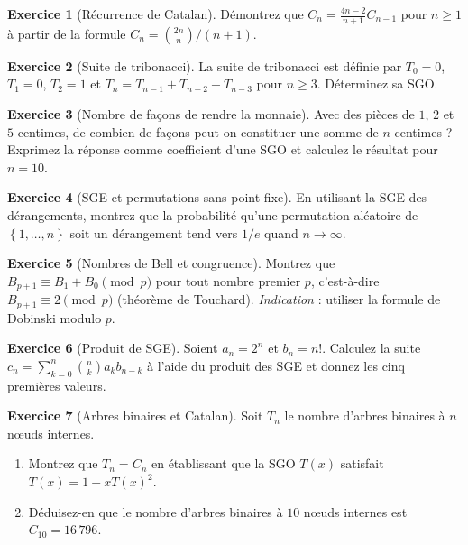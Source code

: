 \documentclass[12pt,a4paper,openany]{book}
\theoremstyle{definition}
\newtheorem{exercice}{Exercice}[chapter]
\theoremstyle{plain}
\theoremstyle{remark}
\newcommand{\set}[1]{\left\{#1\right\}}
\begin{document}
\begin{exercice}[Récurrence de Catalan]
\label{exo:catalan-rec}
Démontrez que $C_n = \frac{4n-2}{n+1} C_{n-1}$ pour $n \geqslant 1$ à partir
de la formule $C_n = \binom{2n}{n}/(n+1)$.
\end{exercice}

\begin{exercice}[Suite de tribonacci]
\label{exo:tribonacci}
La suite de tribonacci est définie par $T_0 = 0$, $T_1 = 0$, $T_2 = 1$ et
$T_n = T_{n-1} + T_{n-2} + T_{n-3}$ pour $n \geqslant 3$. Déterminez sa SGO.
\end{exercice}

\begin{exercice}[Nombre de façons de rendre la monnaie]
\label{exo:monnaie}
Avec des pièces de $1$, $2$ et $5$ centimes, de combien de façons peut-on
constituer une somme de $n$ centimes ? Exprimez la réponse comme coefficient
d'une SGO et calculez le résultat pour $n = 10$.
\end{exercice}

\begin{exercice}[SGE et permutations sans point fixe]
\label{exo:egf-sans-point-fixe}
En utilisant la SGE des dérangements, montrez que la probabilité qu'une
permutation aléatoire de $\set{1,\dots,n}$ soit un dérangement tend
vers $1/e$ quand $n \to \infty$.
\end{exercice}

\begin{exercice}[Nombres de Bell et congruence]
\label{exo:bell-mod}
Montrez que $B_{p+1} \equiv B_1 + B_0 \pmod{p}$ pour tout nombre premier $p$,
c'est-à-dire $B_{p+1} \equiv 2 \pmod{p}$ (théorème de Touchard).
\emph{Indication} : utiliser la formule de Dobinski modulo $p$.
\end{exercice}

\begin{exercice}[Produit de SGE]
\label{exo:egf-produit}
Soient $a_n = 2^n$ et $b_n = n!$. Calculez la suite $c_n = \sum_{k=0}^n \binom{n}{k} a_k b_{n-k}$
à l'aide du produit des SGE et donnez les cinq premières valeurs.
\end{exercice}

\begin{exercice}[Arbres binaires et Catalan]
\label{exo:arbres-catalan}
Soit $T_n$ le nombre d'arbres binaires à $n$ n\oe uds internes.
\begin{enumerate}[label=\alph*)]
  \item Montrez que $T_n = C_n$ en établissant que la SGO $T(x)$ satisfait
    $T(x) = 1 + xT(x)^2$.
  \item Déduisez-en que le nombre d'arbres binaires à $10$ n\oe uds internes
    est $C_{10} = 16\,796$.
\end{enumerate}
\end{exercice}
\end{document}
